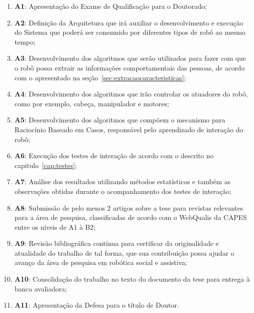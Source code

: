 \begin{enumerate}
	\item \textbf{A1}: Apresentação do Exame de Qualificação para o Doutorado;
	\item \textbf{A2}: Definição da Arquitetura que irá auxiliar o desenvolvimento e execução do Sistema que poderá ser consumido por diferentes tipos de robô ao mesmo tempo;
	\item \textbf{A3}: Desenvolvimento dos algoritmos que serão utilizados para fazer com que o robô possa extrair as informações comportamentais das pessoas, de acordo com o apresentado na seção~\ref{sec:extracaocaracteristicas};
	\item \textbf{A4}: Desenvolvimento dos algoritmos que irão controlar os atuadores do robô, como por exemplo, cabeça, manipulador e motores;
	\item \textbf{A5}: Desenvolvimento dos algoritmos que compõem o mecanismo para Raciocínio Baseado em Casos, responsável pelo aprendizado de interação do robô;
	\item \textbf{A6}: Execução dos testes de interação de acordo com o descrito no capitulo~\ref{cap:testes};
	\item \textbf{A7}: Análise dos resultados utilizando métodos estatísticos e também as observações obtidas durante o acompanhamento dos testes de interação;
	\item \textbf{A8}: Submissão de pelo menos 2 artigos sobre a tese para revistas relevantes para a área de pesquisa, classificadas de acordo com o WebQualis da CAPES entre os níveis de A1 à B2;
	\item \textbf{A9}: Revisão bibliográfica contínua para certificar da originalidade e atualidade do trabalho de tal forma, que sua contribuição possa ajudar o avanço da área de pesquisa em robótica social e assistiva;
	\item \textbf{A10}: Consolidação do trabalho no texto do documento da tese para entrega à banca avaliadora;
	\item \textbf{A11}: Apresentação da Defesa para o título de Doutor.
\end{enumerate}